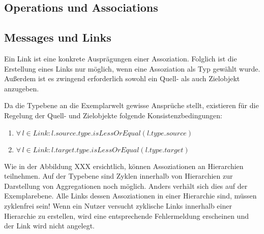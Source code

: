 \subsection{Operations und Associations}


\subsection{Messages und Links}
Ein Link ist eine konkrete Ausprägungen einer Assoziation. 
Folglich ist die Erstellung eines Links nur möglich, wenn eine Assoziation als Typ gewählt wurde. 
Außerdem ist es zwingend erforderlich sowohl ein Quell- als auch Zielobjekt anzugeben.

Da die Typebene an die Exemplarwelt gewisse Ansprüche stellt, existieren für die Regelung der 
Quell- und Zielobjekte folgende Konsistenzbedingungen:
\begin{enumerate}
\item $\forall \, l \in Link: l.source.type.isLessOrEqual(l.type.source)$
\item $\forall \, l \in Link: l.target.type.isLessOrEqual(l.type.target)$
\end{enumerate}
Wie in der Abbildung XXX ersichtlich, können Assoziationen an Hierarchien teilnehmen. Auf der Typebene sind Zyklen innerhalb von Hierarchien zur Darstellung von Aggregationen noch möglich. Anders verhält sich dies auf der Exemplarebene. Alle Links dessen Assoziationen in einer Hierarchie sind, müssen zyklenfrei sein! Wenn ein Nutzer versucht zyklische Links innerhalb einer Hierarchie zu erstellen, wird eine entsprechende Fehlermeldung erscheinen und der Link wird nicht angelegt.


\blindtext